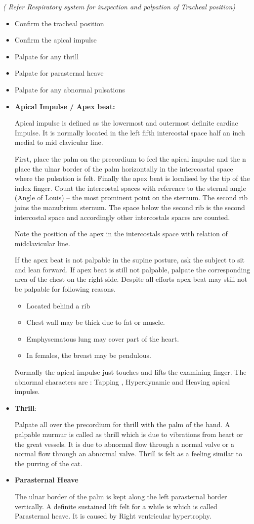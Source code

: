 \documentclass[a4paper,12pt,openany,oneside]{book}
\begin{document}
\emph{( Refer Respiratory system for inspection and palpation of Tracheal position)}
\begin{itemize}
\item{Confirm the tracheal position}
\item{Confirm the apical impulse}
\item{Palpate for any thrill}
\item{Palpate for parasternal heave}
\item{Palpate for any abnormal pulsations}
\item{\textbf{Apical Impulse / Apex beat:}
	\par
	Apical impulse is defined as the lowermost and outermost definite cardiac Impulse. It is normally located in the left fifth intercostal space half an inch medial to mid clavicular line.
	\par
	First, place the palm on the precordium to feel the apical impulse and the n place the ulnar border of the palm horizontally in the intercoastal space where the pulsation is felt. Finally the apex beat is localised by the tip of the index finger. Count the intercostal spaces with reference to the sternal angle (Angle of Louis) – the most prominent point on the sternum. The second rib joins the manubrium sternum. The space below the second rib is the second intercostal space and accordingly other intercostals spaces are counted. 
	\par
	Note the position of the apex in the intercostals space with relation of midclavicular line.
	\par
	If the apex beat is not palpable in the supine posture, ask the subject to sit and lean forward. If apex beat is still not palpable, palpate the corresponding area of the chest on the right side. Despite all efforts apex beat may still not be palpable for following reasons.
	\begin{itemize}
\item{ Located behind a rib}
\item{ Chest wall may be thick due to fat or muscle.}
\item{ Emphysematous lung may cover part of the heart.}
\item{ In females, the breast may be pendulous.}
	\end{itemize}
	\par
	Normally the apical impulse just touches and lifts the examining finger. The abnormal characters are : Tapping , Hyperdynamic and Heaving apical impulse.
	}
\item{\textbf{Thrill}:
	\par
	Palpate all over the precordium for thrill with the palm of the hand. A palpable murmur is called as thrill which is due to vibrations from heart or the great vessels. It is due to abnormal flow through a normal valve or a normal flow through an abnormal valve. Thrill is felt as a feeling similar to the purring of the cat.
	}										    
\item{\textbf{Parasternal Heave}
	\par
The ulnar border of the palm is kept along the left parasternal border vertically. A definite sustained lift felt for a while is which is called Parasternal heave. It is caused by Right ventricular hypertrophy.
}
\end{itemize}
\end{document}
